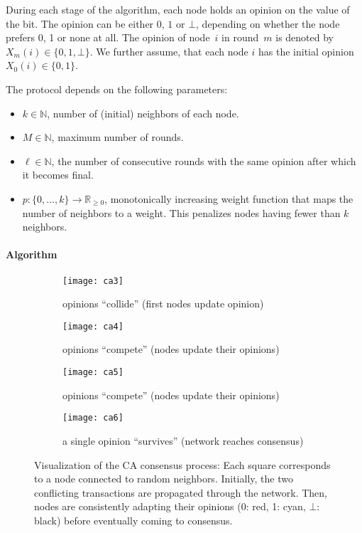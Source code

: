 \documentclass[../main.tex]{subfiles}
\begin{document}
During each stage of the algorithm, each node holds an opinion on the value of the bit.
The opinion can be either $0$, $1$ or $\bot$, depending on whether the node prefers 0, 1 or none at all.
The opinion of node~$i$ in round~$m$ is denoted by~$X_m(i) \in \{0,1, \bot\}$. 
We further assume, that each node $i$ has the initial opinion $X_0(i) \in \{0,1\}$.

The protocol depends on the following parameters:
\begin{itemize}
	\item $k \in \mathbb{N}$, number of (initial) neighbors of each node.
	\item $M \in \mathbb{N}$, maximum number of rounds.
	\item $\ell \in \mathbb{N}$, the number of consecutive rounds with the same opinion after which it becomes final.
	\item $p : \{0,\dots,k\} \to \mathbb{R}_{\geq 0}$, monotonically increasing weight function that maps the number of neighbors to a weight. This penalizes nodes having fewer than $k$ neighbors.
\end{itemize}

\paragraph{Algorithm}

\begin{figure}%
	\captionsetup[sub]{font=footnotesize}
	\centering
	\hfill
	\begin{subfigure}[b]{0.49\linewidth}
		\texttt{[image: ca3]}
		\caption{opinions ``collide'' (first nodes update opinion)}
	\end{subfigure}
	\begin{subfigure}[b]{0.49\linewidth}
		\texttt{[image: ca4]}
		\caption{opinions ``compete'' (nodes update their opinions)}
	\end{subfigure}
	\hfill
	\begin{subfigure}[b]{0.49\linewidth}
		\texttt{[image: ca5]}
		\caption{opinions ``compete'' (nodes update their opinions)}
	\end{subfigure}
	\hfill
	\begin{subfigure}[b]{0.49\linewidth}
		\texttt{[image: ca6]}
		\caption{a single opinion ``survives'' (network reaches consensus)}
	\end{subfigure}
	\caption{Visualization of the CA consensus process:
		Each square corresponds to a node connected to random neighbors.
		Initially, the two conflicting transactions are propagated through the network.
		Then, nodes are consistently adapting their opinions (0: red, 1: cyan, $\bot$: black) before eventually coming to consensus.}
	\label{fig:ca}
\end{figure}
\end{document}
